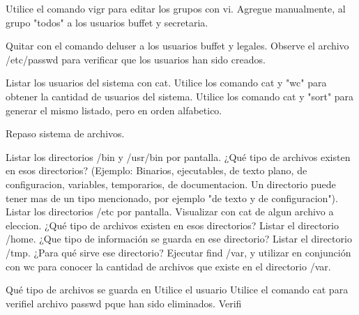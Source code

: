 \documentclass[12pt]{article}
\begin{document}
Utilice el comando vigr para editar los grupos con vi. Agregue manualmente, al grupo "todos" a los usuarios buffet y secretaria.


Quitar con el comando deluser a los usuarios buffet y legales.
Observe el archivo /etc/passwd para verificar que los usuarios han sido creados.


Listar los usuarios del sistema con cat. 
Utilice los comando cat y "wc" para obtener la cantidad de usuarios del sistema.
Utilice los comando cat y "sort" para generar el mismo listado, pero en orden alfabetico.

Repaso sistema de archivos.

Listar los directorios /bin y /usr/bin por pantalla. ¿Qué tipo de archivos existen en esos directorios? (Ejemplo: Binarios, ejecutables, de texto plano, de configuracion, variables, temporarios, de documentacion. Un directorio puede tener mas de un tipo mencionado, por ejemplo "de texto y de configuracion").
Listar los directorios /etc por pantalla. Visualizar con cat de algun archivo a eleccion. ¿Qué tipo de archivos existen en esos directorios?
Listar el directorio /home. ¿Que tipo de información se guarda en ese directorio?
Listar el directorio /tmp. ¿Para qué sirve ese directorio?
Ejecutar find /var, y utilizar en conjunción con wc para conocer la cantidad de archivos que existe en el directorio /var.



Qué tipo de archivos se guarda en 
Utilice el usuario 
Utilice el comando cat para verifiel archivo passwd pque han sido eliminados.
Verifi
\end{document}
